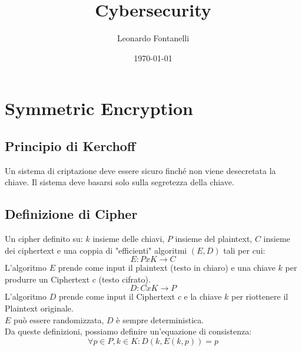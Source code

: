 \documentclass[a4paper,12pt]{article}
\title{Cybersecurity}
\author{Leonardo Fontanelli}
\date{\monthyeardate\today}
\begin{document}

\maketitle
{}

\tableofcontents

\newpage


\section{Symmetric Encryption}

\subsection{Principio di Kerchoff}
Un sistema di criptazione deve essere sicuro finché non viene desecretata la chiave. Il sistema deve basarsi solo sulla segretezza della chiave.

\subsection{Definizione di Cipher}
Un cipher definito su: $k$ insieme delle chiavi, $P$ insieme del plaintext, $C$ insieme dei ciphertext e una coppia di "efficienti" algoritmi $(E,D)$ tali per cui:
$$ E: PxK \rightarrow C$$
L'algoritmo $E$ prende come input il plaintext (testo in chiaro) e una chiave $k$ per produrre un Ciphertext $c$ (testo cifrato).
$$ D: CxK \rightarrow P$$
L'algoritmo $D$ prende come input il Ciphertext $c$ e la chiave $k$ per riottenere il Plaintext originale. \\
$E$ può essere randomizzata, $D$ è sempre deterministica. \\
Da queste definizioni, possiamo definire un'equazione di consistenza:
$$\forall p \in P, k \in K : D(k,E(k,p)) = p$$
\end{document}
